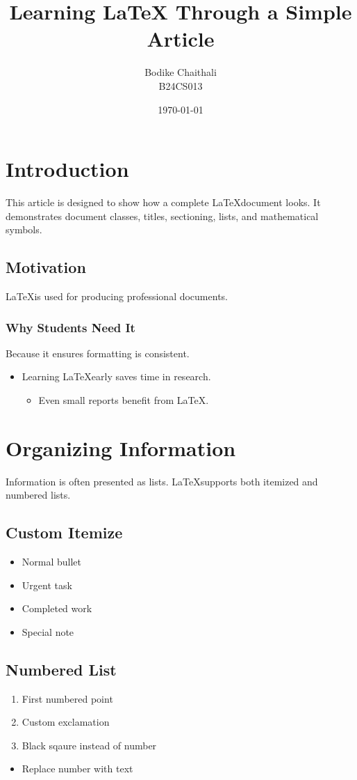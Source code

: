 \documentclass{article}
\title{Learning LaTeX Through a Simple Article}
\author{Bodike Chaithali \\ B24CS013}
\date{\today}
\begin{document}
	\maketitle
	\section{Introduction}
	This article is designed to show how a complete \LaTeX document looks. It
	demonstrates document classes, titles, sectioning, lists, and mathematical
	symbols.
	\subsection{Motivation}
	\LaTeX is used for producing professional documents.
	\subsubsection{Why Students Need It}
	Because it ensures formatting is consistent. 
	\begin{itemize}[label={}, leftmargin=5.6em]
		\item[\textbf{Key Point}] Learning \LaTeX early saves time in research.
		\begin{itemize}
			\item[\textbf{Mini Note}] Even small reports benefit from \LaTeX.
		\end{itemize}
	\end{itemize}
	\section{Organizing Information}
	Information is often presented as lists. \LaTeX supports both itemized and
	numbered lists.
	\subsection{Custom Itemize}
	\begin{itemize}
		\item Normal bullet
		\item[!] Urgent task
		\item[$\blacksquare$] Completed work
	\end{itemize}
	\begin{itemize}
		\item[NOTE] Special note
	\end{itemize}
	\subsection{Numbered List}
	\begin{enumerate}
		\item First numbered point
			\item[!] Custom exclamation
		\item[$\blacksquare$] Black sqaure instead of number
	\end{enumerate}
	\begin{itemize}
		\item[NOTE] Replace number with text
	\end{itemize}
\end{document}
